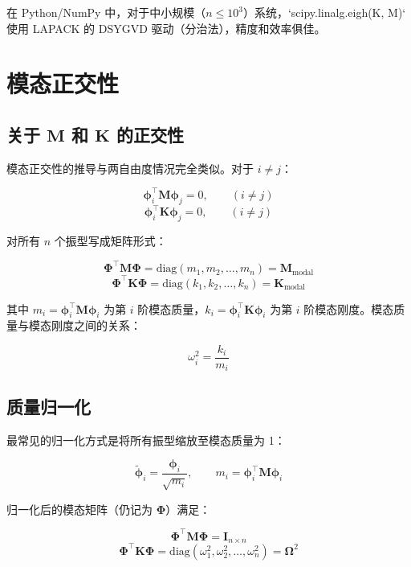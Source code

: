 在 Python/NumPy 中，对于中小规模（$n \leq 10^3$）系统，`scipy.linalg.eigh(K, M)` 使用 LAPACK 的 DSYGVD 驱动（分治法），精度和效率俱佳。

\section{模态正交性}

\subsection{关于 $\mathbf{M}$ 和 $\mathbf{K}$ 的正交性}

模态正交性的推导与两自由度情况完全类似。对于 $i \neq j$：

\begin{myformula}
\[
\bm{\phi}_i^{\top} \mathbf{M} \bm{\phi}_j = 0, \qquad (i \neq j)
\]
\[
\bm{\phi}_i^{\top} \mathbf{K} \bm{\phi}_j = 0, \qquad (i \neq j)
\]
\end{myformula}

对所有 $n$ 个振型写成矩阵形式：

\begin{myformula}
\[
\mathbf{\Phi}^{\top} \mathbf{M} \mathbf{\Phi} = \text{diag}(m_1, m_2, \ldots, m_n) = \mathbf{M}_{\text{modal}}
\]
\[
\mathbf{\Phi}^{\top} \mathbf{K} \mathbf{\Phi} = \text{diag}(k_1, k_2, \ldots, k_n) = \mathbf{K}_{\text{modal}}
\]
\end{myformula}

其中 $m_i = \bm{\phi}_i^{\top}\mathbf{M}\bm{\phi}_i$ 为第 $i$ 阶模态质量，$k_i = \bm{\phi}_i^{\top}\mathbf{K}\bm{\phi}_i$ 为第 $i$ 阶模态刚度。模态质量与模态刚度之间的关系：

\[
\omega_i^2 = \frac{k_i}{m_i}
\]

\subsection{质量归一化}

最常见的归一化方式是将所有振型缩放至模态质量为 1：

\[
\tilde{\bm{\phi}}_i = \frac{\bm{\phi}_i}{\sqrt{m_i}}, \qquad m_i = \bm{\phi}_i^{\top}\mathbf{M}\bm{\phi}_i
\]

归一化后的模态矩阵（仍记为 $\mathbf{\Phi}$）满足：

\begin{myformula}
\[
\mathbf{\Phi}^{\top} \mathbf{M} \mathbf{\Phi} = \mathbf{I}_{n\times n}
\]
\[
\mathbf{\Phi}^{\top} \mathbf{K} \mathbf{\Phi} = \text{diag}(\omega_1^2, \omega_2^2, \ldots, \omega_n^2) = \mathbf{\Omega}^2
\]
\end{myformula}

